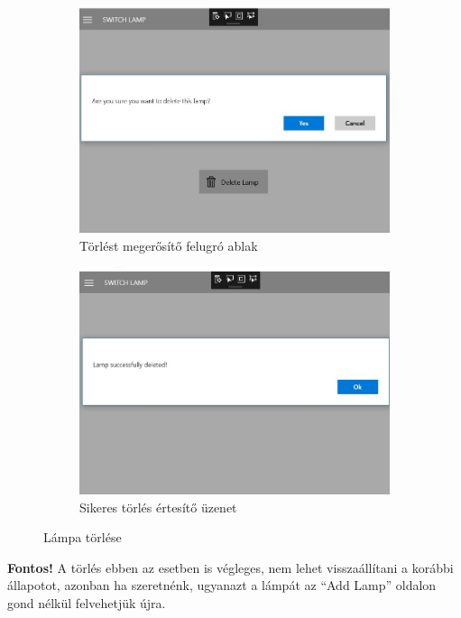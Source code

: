 \documentclass[a4paper,12pt]{report}
\begin{document}
\begin{figure}[H]
    \centering
    \begin{subfigure}[b]{0.4\linewidth}
        \includegraphics[width=\linewidth]{images/suredelete.jpg}
        \caption{Törlést megerősítő felugró ablak}
    \end{subfigure}
    \begin{subfigure}[b]{0.4\linewidth}
        \includegraphics[width=\linewidth]{images/deletesuccess.jpg}
        \caption{Sikeres törlés értesítő üzenet}
    \end{subfigure}
    \caption{Lámpa törlése}
    \label{fig:LampDelete}
\end{figure}

    \textbf{Fontos!} A törlés ebben az esetben is végleges, nem lehet visszaállítani a korábbi állapotot, azonban ha szeretnénk,
    ugyanazt a lámpát az ``Add Lamp'' oldalon gond nélkül felvehetjük újra.
\end{document}
